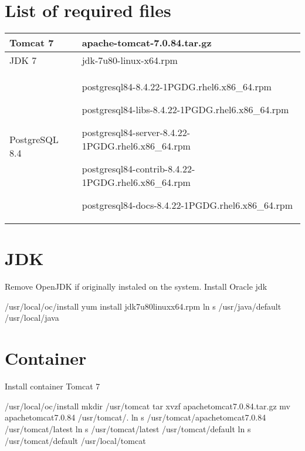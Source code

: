 \documentclass[letterpaper,10pt,english]{sphinxmanual}
\begin{document}
\section{List of required files}
\label{\detokenize{trl1:list-of-required-files}}

\begin{savenotes}\sphinxattablestart
\centering
\begin{tabulary}{\linewidth}[t]{|T|T|}
\hline

Tomcat 7
&
apache-tomcat-7.0.84.tar.gz
\\
\hline
JDK 7
&
jdk-7u80-linux-x64.rpm
\\
\hline
PostgreSQL 8.4
&
postgresql84-8.4.22-1PGDG.rhel6.x86\_64.rpm

postgresql84-libs-8.4.22-1PGDG.rhel6.x86\_64.rpm

postgresql84-server-8.4.22-1PGDG.rhel6.x86\_64.rpm

postgresql84-contrib-8.4.22-1PGDG.rhel6.x86\_64.rpm

postgresql84-docs-8.4.22-1PGDG.rhel6.x86\_64.rpm
\\
\hline
\end{tabulary}
\par
\sphinxattableend\end{savenotes}


\section{JDK}
\label{\detokenize{trl1:jdk}}
Remove OpenJDK if originally instaled on the system. Install Oracle jdk

%
\begin{sphinxVerbatim}[commandchars=\\\{\}]
 /usr/local/oc/install
yum install jdk\PYGZhy{}7u80\PYGZhy{}linux\PYGZhy{}x64.rpm
ln \PYGZhy{}s /usr/java/default /usr/local/java
\end{sphinxVerbatim}


\section{Container}
\label{\detokenize{trl1:container}}
Install container Tomcat 7

%
\begin{sphinxVerbatim}[commandchars=\\\{\}]
 /usr/local/oc/install
mkdir /usr/tomcat
tar xvzf apache\PYGZhy{}tomcat\PYGZhy{}7.0.84.tar.gz
mv apache\PYGZhy{}tomcat\PYGZhy{}7.0.84 /usr/tomcat/.
ln \PYGZhy{}s /usr/tomcat/apache\PYGZhy{}tomcat\PYGZhy{}7.0.84 /usr/tomcat/latest
ln \PYGZhy{}s /usr/tomcat/latest /usr/tomcat/default
ln \PYGZhy{}s /usr/tomcat/default /usr/local/tomcat
\end{sphinxVerbatim}
\end{document}
